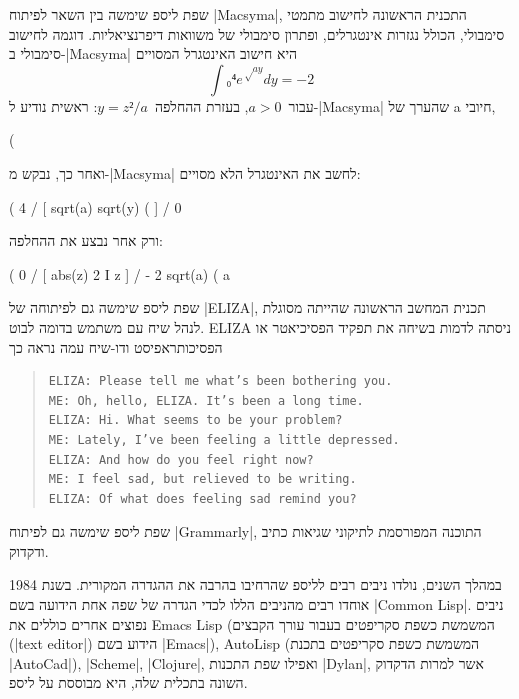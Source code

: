 שפת ליספ שימשה בין השאר לפיתוח \E|Macsyma|, התכנית הראשונה לחישוב מתמטי
סימבולי, הכולל נגזרות אינטגרלים, ופתרון סימבולי של משוואות דיפרנציאליות. דוגמה
לחישוב סימבולי ב-\E|Macsyma| היא חישוב האינטגרל המסויים \[
  ∫₀⁴ e^{√{ay}}dy=-2
\] עבור~$a>0$, בעזרת ההחלפה~$y=z²/a$:
ראשית נודיע ל-\E|Macsyma| שהערך של a חיובי,
\begin{code}
(%
\end{code}
ואחר כך, נבקש מ-\E|Macsyma| לחשב את האינטגרל הלא מסויים:
\begin{code}
(%
 4
 /
 [ sqrt(a) sqrt(y) (%
 ]
 /
 0
\end{code}
ורק אחר נבצע את ההחלפה:
\begin{code}
(%
 0
 /
 [ abs(z)
 2 I z %
 ]
 /
- 2 sqrt(a)
(%
 a
\end{code}

שפת ליספ שימשה גם לפיתוחה של \E|ELIZA|, תכנית המחשב הראשונה שהייתה מסוגלת לנהל
שיח עם משתמש בדומה לבוט. ELIZA ניסתה לדמות בשיחה את תפקיד הפסיכיאטר או
הפסיכותראפיסט ודו-שיח עמה נראה כך

\begin{quote}
  \begin{minipage}{0.8\textwidth}
  \begin{LTR}
    \scriptsize
    \begin{verbatim}
ELIZA: Please tell me what’s been bothering you.
ME: Oh, hello, ELIZA. It’s been a long time.
ELIZA: Hi. What seems to be your problem?
ME: Lately, I’ve been feeling a little depressed.
ELIZA: And how do you feel right now?
ME: I feel sad, but relieved to be writing.
ELIZA: Of what does feeling sad remind you?
\end{verbatim}
  \end{LTR}
\end{minipage}
\end{quote}
שפת ליספ שימשה גם לפיתוח \E|Grammarly|, התוכנה המפורסמת לתיקוני שגיאות כתיב
ודקדוק.

במהלך השנים, נולדו ניבים רבים לליספ שהרחיבו בהרבה את ההגדרה המקורית. בשנת 1984
אוחדו רבים מהניבים הללו לכדי הגדרה של שפה אחת הידועה בשם \E|Common Lisp|. ניבים
נפוצים אחרים כוללים את Emacs Lisp (המשמשת כשפת סקריפטים בעבור עורך הקבצים
(\E|text editor|) הידוע בשם \E|Emacs|), AutoLisp (המשמשת כשפת סקריפטים בתכנת
\E|AutoCad|), \E|Scheme|, \E|Clojure|, ואפילו שפת התכנות \E|Dylan|, אשר למרות
הדקדוק השונה בתכלית שלה, היא מבוססת על ליספ.

